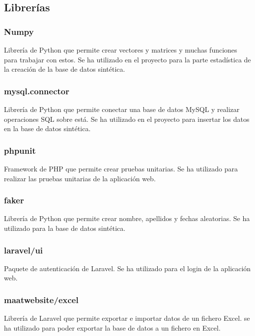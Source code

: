 \subsection{Librerías}\label{librerias}

\subsubsection{Numpy}

Librería de Python que permite crear vectores y matrices y muchas funciones para trabajar con estos. Se ha utilizado en el proyecto para la parte estadística de la creación de la base de datos sintética.  

\subsubsection{mysql.connector}

Librería de Python que permite conectar una base de datos MySQL y realizar operaciones SQL sobre está. Se ha utilizado en el proyecto para insertar los datos en la base de datos sintética.

\subsubsection{phpunit}

Framework de PHP que permite crear pruebas unitarias. Se ha utilizado para realizar las pruebas unitarias de la aplicación web.

\subsubsection{faker}

Librería de Python que permite crear nombre, apellidos y fechas aleatorias. Se ha utilizado para la base de datos sintética. 

\subsubsection{laravel/ui}

Paquete de autenticación de Laravel. Se ha utilizado para el login de la aplicación web.

\subsubsection{maatwebsite/excel}

Librería de Laravel que permite exportar e importar datos de un fichero Excel. se ha utilizado para poder exportar la base de datos a un fichero en Excel.

